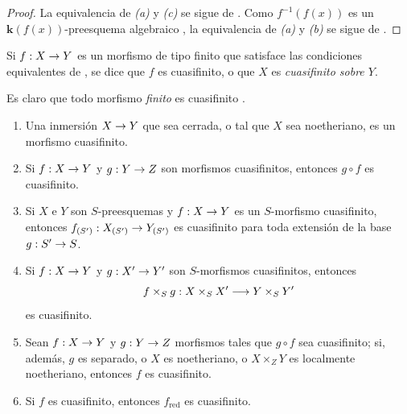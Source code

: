 \documentclass[oneside,10pt]{amsart}
\makeatletter
\newcommand{\ega@arrow}[2]{\mathchoice{#1}{#2}{#2}{#2}}
\renewcommand{\to}{\ega@arrow{\longrightarrow}{\rightarrow}}
\let\EGAOriginalLabel\label
\renewcommand{\label}[1]{\phantomsection\EGAOriginalLabel{#1}}
\makeatother
\begin{document}
\begin{proof}
La equivalencia de \emph{(a)} y \emph{(c)} se sigue de .
Como $f^{-1}(f(x))$ es un $\boldsymbol{k}(f(x))$-preesquema algebraico , la equivalencia de \emph{(a)} y \emph{(b)} se sigue de .
\end{proof}

\begin{definition}[6.2.3]
\label{II.6.2.3-fr}
Si $f:X\to Y$ es un morfismo de tipo finito que satisface las condiciones equivalentes de \textup{}, se dice que $f$ es cuasifinito, o que $X$ es \emph{cuasifinito sobre $Y$}.
\end{definition}

Es claro que todo morfismo \emph{finito} es cuasifinito .

\begin{proposition}[6.2.4]
\label{II.6.2.4-fr}
\medskip\noindent
\begin{enumerate}
  \item[{\rm(i)}] Una inmersión $X\to Y$ que sea cerrada, o tal que $X$ sea noetheriano, es un morfismo cuasifinito.
  \item[{\rm(ii)}] Si $f:X\to Y$ y $g:Y\to Z$ son morfismos cuasifinitos, entonces $g\circ f$ es cuasifinito.
  \item[{\rm(iii)}] Si $X$ e $Y$ son $S$-preesquemas y $f:X\to Y$ es un $S$-morfismo cuasifinito, entonces $f_{(S')}:X_{(S')}\to Y_{(S')}$ es cuasifinito para toda extensión de la base $g:S'\to S$.
  \item[{\rm(iv)}] Si $f:X\to Y$ y $g:X'\to Y'$ son $S$-morfismos cuasifinitos, entonces
    \[
f\times_S g:X\times_S X'\to Y\times_S Y'
\]
    es cuasifinito.
  \item[{\rm(v)}] Sean $f:X\to Y$ y $g:Y\to Z$ morfismos tales que $g\circ
f$ sea cuasifinito; si, además, $g$ es separado, o $X$ es noetheriano, o $X\times_ZY$ es localmente noetheriano, entonces $f$ es cuasifinito.
  \item[{\rm(vi)}] Si $f$ es cuasifinito, entonces $f_{\mathrm{red}}$ es cuasifinito.
\end{enumerate}
\end{proposition}
\end{document}
